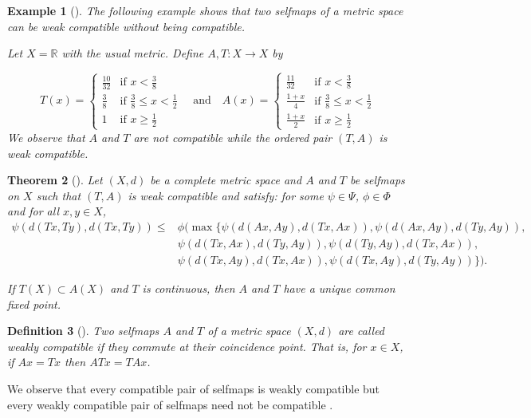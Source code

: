 \documentclass[11]{article}
\newtheorem{definition}{Definition}[section]
\newtheorem{theorem}[definition]{Theorem}
\newtheorem{example}[definition]{Example}
\numberwithin{equation}{section}
\begin{document}
\begin{example}[\cite{Antony1991}] \label{ex:1.8}
The following example shows that two selfmaps of a metric space can be weak compatible without being compatible.

Let $X=\mathbb{R}$ with the usual metric. Define $A,T:X\to X$ by

\[
T(x)=\left\{\begin{array}{ll}
\frac{10}{32} & \text{if } x<\frac{3}{8} \\ 
\frac{3}{8} & \text{if } \frac{3}{8}\leq x<\frac{1}{2} \\
1 & \text{if } x\geq\frac{1}{2}
\end{array}\right.
\quad\text{and}\quad 
A(x)=\left\{\begin{array}{ll}
\frac{11}{32} & \text{if } x<\frac{3}{8} \\ 
\frac{1+x}{4} & \text{if } \frac{3}{8}\leq x<\frac{1}{2} \\ 
\frac{1+x}{2} & \text{if } x\geq\frac{1}{2}
\end{array}\right.
\]
We observe that $A$ and $T$ are not compatible while the ordered pair $(T,A)$ is weak compatible.
\end{example}

\begin{theorem}[\cite{Sastry2003}] \label{thm:1.9}
Let $(X,d)$ be a complete metric space and $A$ and $T$ be selfmaps on $X$ such that $(T,A)$ is weak compatible and satisfy: for some $\psi\in\Psi$, $\phi\in\Phi$ and for all $x,y\in X$,
\begin{align*}
    \psi(d(Tx,Ty),d(Tx,Ty)) \leq &\phi(\max\{\psi(d(Ax,Ay),d(Tx,Ax)), \psi(d(Ax,Ay),d(Ty,Ay)), \\
&\psi(d(Tx,Ax),d(Ty,Ay)), \psi(d(Ty,Ay),d(Tx,Ax)), \\
&\psi(d(Tx,Ay),d(Tx,Ax)), 
\psi(d(Tx,Ay),d(Ty,Ay))\}).
\end{align*}

If $T(X)\subset A(X)$ and $T$ is continuous, then $A$ and $T$ have a unique common fixed point.
\end{theorem}

\begin{definition}[\cite{Jungck1994}]
Two selfmaps $A$ and $T$ of a metric space $(X,d)$ are called weakly compatible if they commute at their coincidence point. That is, for $x\in X$, if $Ax=Tx$ then $ATx=TAx$.
\end{definition}

We observe that every compatible pair of selfmaps is weakly compatible but every weakly compatible pair of selfmaps need not be compatible \cite{Singh1997}.
\end{document}
